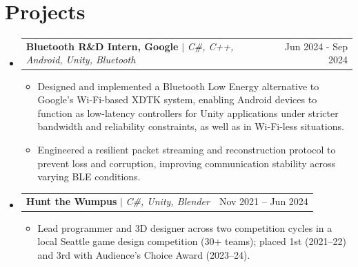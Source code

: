 \documentclass[letterpaper,11pt]{article}
\makeatletter
\newcommand{\resumeItem}[1]{
  \item\small{
    {#1 \vspace{-2pt}}
  }
}
\newcommand{\resumeProjectHeading}[2]{
    \item
    \begin{tabular*}{0.97\textwidth}{l@{\extracolsep{\fill}}r}
      \small#1 & #2 \\
    \end{tabular*}\vspace{-7pt}
}
\newcommand{\resumeSubHeadingListStart}{\begin{itemize}[leftmargin=0.15in, label={}]}
\newcommand{\resumeSubHeadingListEnd}{\end{itemize}}
\newcommand{\resumeItemListStart}{\begin{itemize}}
\newcommand{\resumeItemListEnd}{\end{itemize}\vspace{-5pt}}
\makeatother
\begin{document}
\section{Projects}
    \resumeSubHeadingListStart
    \resumeProjectHeading
          {\textbf{Bluetooth R\&D Intern, Google} $|$ \emph{C\#, C++, Android, Unity, Bluetooth}}{Jun 2024 - Sep 2024}
          \resumeItemListStart
            \resumeItem{Designed and implemented a Bluetooth Low Energy alternative to Google's Wi-Fi-based XDTK system, enabling Android devices to function as low-latency controllers for Unity applications under stricter bandwidth and reliability constraints, as well as in Wi-Fi-less situations.}
            \resumeItem{Engineered a resilient packet streaming and reconstruction protocol to prevent loss and corruption, improving communication stability across varying BLE conditions.}
          \resumeItemListEnd

      \resumeProjectHeading
          {\textbf{Hunt the Wumpus} $|$ \emph{C\#, Unity, Blender}}{Nov 2021 -- Jun 2024}
          \resumeItemListStart
            \resumeItem{Lead programmer and 3D designer across two competition cycles in a local Seattle game design competition (30+ teams); placed 1st (2021--22) and 3rd with Audience's Choice Award (2023--24).}
          \resumeItemListEnd


    \resumeSubHeadingListEnd
\end{document}
